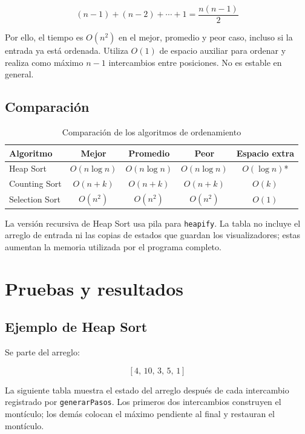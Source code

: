 \documentclass[12pt,a4paper]{article}
\begin{document}
\[
(n-1)+(n-2)+\cdots+1
=\frac{n(n-1)}{2}
\]

Por ello, el tiempo es \(O(n^2)\) en el mejor, promedio y peor caso, incluso si la entrada ya está ordenada. Utiliza \(O(1)\) de espacio auxiliar para ordenar y realiza como máximo \(n-1\) intercambios entre posiciones. No es estable en general.

\subsection{Comparación}

\begin{table}[H]
\centering
\caption{Comparación de los algoritmos de ordenamiento}
\begin{tabular}{lcccc}
\toprule
\textbf{Algoritmo} & \textbf{Mejor} & \textbf{Promedio} & \textbf{Peor} & \textbf{Espacio extra} \\
\midrule
Heap Sort & \(O(n\log n)\) & \(O(n\log n)\) & \(O(n\log n)\) & \(O(\log n)\)* \\
Counting Sort & \(O(n+k)\) & \(O(n+k)\) & \(O(n+k)\) & \(O(k)\) \\
Selection Sort & \(O(n^2)\) & \(O(n^2)\) & \(O(n^2)\) & \(O(1)\) \\
\bottomrule
\end{tabular}
\end{table}

\noindent *La versión recursiva de Heap Sort usa pila para \texttt{heapify}. La tabla no incluye el arreglo de entrada ni las copias de estados que guardan los visualizadores; estas aumentan la memoria utilizada por el programa completo.

\section{Pruebas y resultados}

\subsection{Ejemplo de Heap Sort}

Se parte del arreglo:

\[
[4,\,10,\,3,\,5,\,1]
\]

La siguiente tabla muestra el estado del arreglo después de cada intercambio registrado por \texttt{generarPasos}. Los primeros dos intercambios construyen el montículo; los demás colocan el máximo pendiente al final y restauran el montículo.
\end{document}
